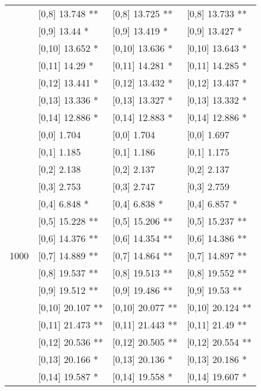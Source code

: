 \begin{table}
\begin{tabular}[t]{llll}
 & {}[0,8] 13.748 ** & {}[0,8] 13.725 ** & {}[0,8] 13.733 **\\
 & {}[0,9] 13.44 * & {}[0,9] 13.419 * & {}[0,9] 13.427 *\\
\addlinespace
 & {}[0,10] 13.652 * & {}[0,10] 13.636 * & {}[0,10] 13.643 *\\
 & {}[0,11] 14.29 * & {}[0,11] 14.281 * & {}[0,11] 14.285 *\\
 & {}[0,12] 13.441 * & {}[0,12] 13.432 * & {}[0,12] 13.437 *\\
 & {}[0,13] 13.336 * & {}[0,13] 13.327 * & {}[0,13] 13.332 *\\
 & {}[0,14] 12.886 * & {}[0,14] 12.883 * & {}[0,14] 12.886 *\\
\addlinespace
 & {}[0,0] 1.704 & {}[0,0] 1.704 & {}[0,0] 1.697\\
 & {}[0,1] 1.185 & {}[0,1] 1.186 & {}[0,1] 1.175\\
 & {}[0,2] 2.138 & {}[0,2] 2.137 & {}[0,2] 2.137\\
 & {}[0,3] 2.753 & {}[0,3] 2.747 & {}[0,3] 2.759\\
 & {}[0,4] 6.848 * & {}[0,4] 6.838 * & {}[0,4] 6.857 *\\
\addlinespace
 & {}[0,5] 15.228 ** & {}[0,5] 15.206 ** & {}[0,5] 15.237 **\\
 & {}[0,6] 14.376 ** & {}[0,6] 14.354 ** & {}[0,6] 14.386 **\\
1000 & {}[0,7] 14.889 ** & {}[0,7] 14.864 ** & {}[0,7] 14.897 **\\
 & {}[0,8] 19.537 ** & {}[0,8] 19.513 ** & {}[0,8] 19.552 **\\
 & {}[0,9] 19.512 ** & {}[0,9] 19.486 ** & {}[0,9] 19.53 **\\
\addlinespace
 & {}[0,10] 20.107 ** & {}[0,10] 20.077 ** & {}[0,10] 20.124 **\\
 & {}[0,11] 21.473 ** & {}[0,11] 21.443 ** & {}[0,11] 21.49 **\\
 & {}[0,12] 20.536 ** & {}[0,12] 20.505 ** & {}[0,12] 20.554 **\\
 & {}[0,13] 20.166 * & {}[0,13] 20.136 * & {}[0,13] 20.186 *\\
 & {}[0,14] 19.587 * & {}[0,14] 19.558 * & {}[0,14] 19.607 *\\
\bottomrule
\end{tabular}
\end{table}
